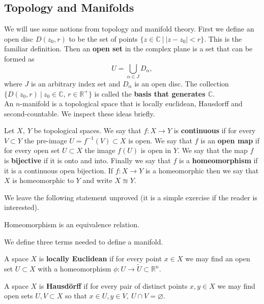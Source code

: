 \documentclass[11pt,oneside,final]{article}
\begin{document}

\subsection{Topology and Manifolds} We will use some notions from topology
and manifold theory. First we define an open disc \(D(z_0, r)\) to be the
set of points \(\{z \in \mathbb C\ |\ |z - z_0| < r\}\). This is the familiar
definition. Then an \textbf{open set} in the complex plane is a set that can
be formed as
\[U = \bigcup_{\alpha\in J}D_\alpha,\]
where \(J\) is an arbitrary index set and \(D_\alpha\) is an open disc. The 
collection \(\{D(z_0, r)\ |\ z_0 \in \mathbb C,\, r \in \mathbb R^+\}\) is
called the \textbf{basis that generates \(\mathbb C\)}. \\

An \(n\)-manifold is a topological space that is locally euclidean, Hausdorff
and second-countable. We inspect these ideas briefly.


\begin{dfn} Let \(X,\ Y\) be topological spaces. We say that \(f: X \rightarrow
	Y\) is \textbf{continuous} if for every \(V \subset Y\) the pre-image \(U =
	f^{-1}(V) \subset X\) is open. We say that \(f\) is an \textbf{open map} if
	for every open set \(U \subset X\) the image \(f(U)\) is open in \(Y\). We 
	say that the map \(f\) is \textbf{bijective} if it is onto and into.
	Finally we say that \(f\) is a \textbf{homeomorphism} if it is a continuous 
	open bijection. If \(f: X \rightarrow Y\) is a homeomorphic then we say 
	that \(X\) is homeomorphic to \(Y\) and write \(X \approxeq Y\). 
\end{dfn}
We leave the following statement unproved (it is a simple exercise if the
reader is interested).
\begin{thm} Homeomorphism is an equivalence relation. \end{thm}

We define three terms needed to define a manifold.
\begin{dfn} A space \(X\) is \textbf{locally Euclidean} 
if for every point \(x \in X\) we may find an open set \(U \subset X\) with 
a homeomorphism \(\phi: U \rightarrow \tilde{U} \subset \mathbb R^n\).
\end{dfn}

\begin{dfn} A space \(X\) is \textbf{Hausd\"orff} if for every pair of distinct
points \(x,y \in X\) we may find open sets \(U, V \subset X\) so that \(x \in
U, y \in V,\ U\cap V = \varnothing\).  

\end{dfn}
\end{document}
